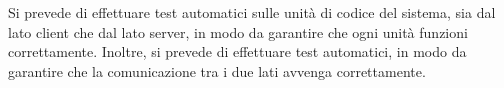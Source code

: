 Si prevede di effettuare test automatici sulle unità di codice del sistema, sia dal lato client che dal lato server, in modo da garantire che ogni unità funzioni correttamente. Inoltre, si prevede di effettuare test automatici, in modo da garantire che la comunicazione tra i due lati avvenga correttamente.